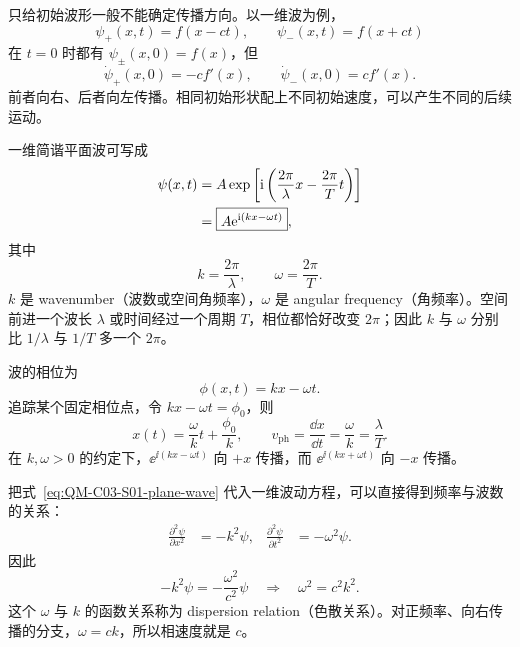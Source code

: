 只给初始波形一般不能确定传播方向。以一维波为例，
\begin{equation}
  \psi_+(x,t)=f(x-ct),
  \qquad
  \psi_-(x,t)=f(x+ct)
  \label{eq:QM-C03-S01-opposite-traveling-waves}
\end{equation}
在 $t=0$ 时都有 $\psi_\pm(x,0)=f(x)$，但
\[
  \dot\psi_+(x,0)=-cf'(x),
  \qquad
  \dot\psi_-(x,0)=cf'(x).
\]
前者向右、后者向左传播。相同初始形状配上不同初始速度，可以产生不同的后续运动。


一维简谐平面波可写成
\begin{align}
  \psi(x,t)
  &=A\exp\left[\mathrm{i}\left(
    \frac{2\pi}{\lambda}x-
    \frac{2\pi}{T}t
  \right)\right] \notag\\
  &=\boxed{A\mathrm{e}^{\mathrm{i}(kx-\omega t)}},
  \label{eq:QM-C03-S01-plane-wave}
\end{align}
其中
\begin{equation}
  k=\frac{2\pi}{\lambda},
  \qquad
  \omega=\frac{2\pi}{T}.
  \label{eq:QM-C03-S01-k-omega-definitions}
\end{equation}
$k$ 是 wavenumber（波数或空间角频率），$\omega$ 是 angular frequency（角频率）。空间前进一个波长 $\lambda$ 或时间经过一个周期 $T$，相位都恰好改变 $2\pi$；因此 $k$ 与 $\omega$ 分别比 $1/\lambda$ 与 $1/T$ 多一个 $2\pi$。

波的相位为
\[
  \phi(x,t)=kx-\omega t.
\]
追踪某个固定相位点，令 $kx-\omega t=\phi_0$，则
\begin{equation}
  x(t)=\frac{\omega}{k}t+\frac{\phi_0}{k},
  \qquad
  v_{\mathrm{ph}}=\frac{\dd x}{\dd t}=\frac{\omega}{k}
  =\frac{\lambda}{T}.
  \label{eq:QM-C03-S01-phase-velocity}
\end{equation}
在 $k,\omega>0$ 的约定下，$\ee^{\ii(kx-\omega t)}$ 向 $+x$ 传播，而 $\ee^{\ii(kx+\omega t)}$ 向 $-x$ 传播。

把式~\eqref{eq:QM-C03-S01-plane-wave} 代入一维波动方程，可以直接得到频率与波数的关系：
\begin{align}
  \frac{\partial^2\psi}{\partial x^2}
  &=-k^2\psi,
  &
  \frac{\partial^2\psi}{\partial t^2}
  &=-\omega^2\psi.
  \label{eq:QM-C03-S01-plane-wave-second-derivatives}
\end{align}
因此
\begin{equation}
  -k^2\psi
  =-\frac{\omega^2}{c^2}\psi
  \quad\Longrightarrow\quad
  \boxed{\omega^2=c^2k^2}.
  \label{eq:QM-C03-S01-dispersion-relation}
\end{equation}
这个 $\omega$ 与 $k$ 的函数关系称为 dispersion relation（色散关系）。对正频率、向右传播的分支，$\omega=ck$，所以相速度就是 $c$。

